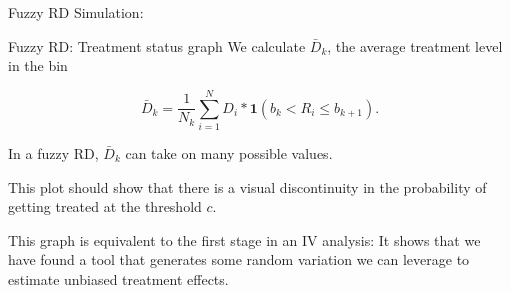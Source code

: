 \documentclass[
  ignorenonframetext,
]{beamer}
\newenvironment{Shaded}{\begin{snugshade}}{\end{snugshade}}
\newcommand{\CommentTok}[1]{\textcolor[rgb]{0.56,0.35,0.01}{\textit{#1}}}
\newcommand{\DecValTok}[1]{\textcolor[rgb]{0.00,0.00,0.81}{#1}}
\newcommand{\FloatTok}[1]{\textcolor[rgb]{0.00,0.00,0.81}{#1}}
\newcommand{\NormalTok}[1]{#1}
\newcommand{\OtherTok}[1]{\textcolor[rgb]{0.56,0.35,0.01}{#1}}
\newcommand{\SpecialCharTok}[1]{\textcolor[rgb]{0.00,0.00,0.00}{#1}}
\begin{document}
\begin{frame}[fragile]{Fuzzy RD Simulation:}
\begin{Shaded}
\end{Shaded}
\end{frame}

\begin{frame}{Fuzzy RD: Treatment status graph}
\protect\hypertarget{fuzzy-rd-treatment-status-graph}{}
We calculate \(\bar{D}_k\), the average treatment level in the bin

\[
\bar{D}_k=\frac{1}{N_k}\sum_{i=1}^ND_i*\mathbf{1}(b_k<R_i\leq b_{k+1}).
\]

In a fuzzy RD, \(\bar{D}_k\) can take on many possible values.

This plot should show that there is a visual discontinuity in the
probability of getting treated at the threshold \(c\).

This graph is equivalent to the first stage in an IV analysis: It shows
that we have found a tool that generates some random variation we can
leverage to estimate unbiased treatment effects.
\end{frame}
\end{document}
